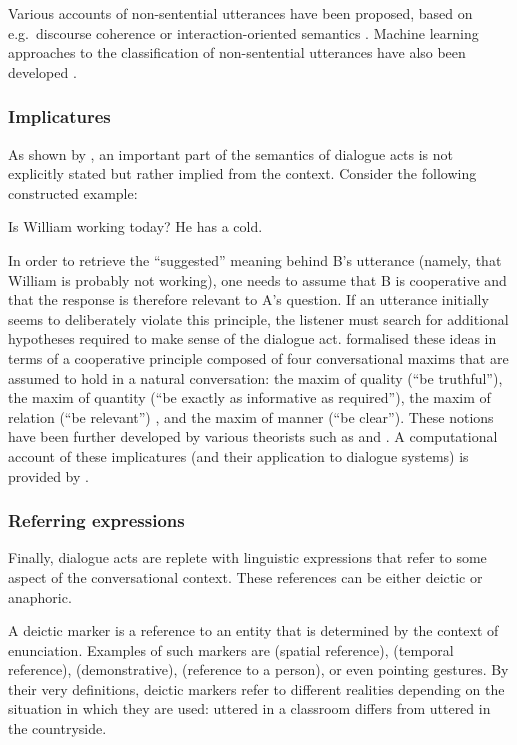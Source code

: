 Various accounts of non-sentential utterances have been proposed, based on e.g.\ discourse coherence \citep{Schlangen03theinterpretation} or interaction-oriented semantics \citep{fernandez2006non,Ginzburg2012}. Machine learning approaches to the classification of non-sentential utterances have also been developed \citep{Schlangen:2005,Fernandez:2007}. 


\subsubsection*{Implicatures}
As shown by \cite{Grice1989}, an important part of the semantics of dialogue acts is not explicitly stated but rather implied from the context.  Consider the following constructed example: 
\begin{center}
\begin{dialogue}
 Is William working today?
 He has a cold.
\end{dialogue}
\end{center}
In order to retrieve the ``suggested'' meaning behind B's utterance (namely, that William is probably not working), one needs to assume that B is cooperative and that the response is therefore relevant to A's question.  If an utterance initially seems to deliberately violate this principle, the listener must search for additional hypotheses required to make sense of the dialogue act. \cite{Grice1989} formalised these ideas in terms of a cooperative principle composed of four conversational maxims that are assumed to hold in a natural conversation: the maxim of quality (``be truthful''), the maxim of quantity (``be exactly as informative as required''), the maxim of relation (``be relevant'') , and the maxim of manner (``be clear'').  These notions have been further developed by various theorists such as \cite{wilson2002relevance} and \cite{horn2008handbook}.  A computational account of these implicatures (and their application to dialogue systems) is provided by \cite{benotti2010implicature}. 

\subsubsection*{Referring expressions}

Finally, dialogue acts are replete with linguistic expressions that refer to some aspect of the conversational context.  These references can be either deictic or anaphoric. 

A deictic marker is a reference to an entity that is determined by the context of enunciation.  Examples of such markers are  (spatial reference),  (temporal reference),  (demonstrative),  (reference to a person), or even pointing gestures. By their very definitions, deictic markers refer to different realities depending on the situation in which they are used:  uttered in a classroom differs from  uttered in the countryside.  

